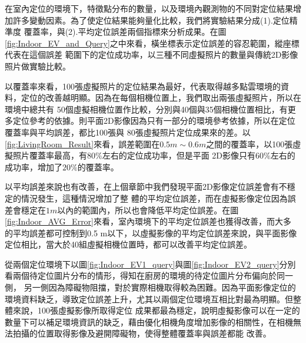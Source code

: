 		在室內定位的環境下，特徵點分布的數量，以及環境內觀測物的不同對定位結果增加許多變動因素。為了使定位結果能夠量化比較，我們將實驗結果分成(1).定位精準度
	覆蓋率，與(2).平均定位誤差兩個指標來分析成果。在圖\ref{fig:Indoor_EV_and_Query}之中來看，橫坐標表示定位誤差的容忍範圍，縱座標代表在這個誤差
	範圍下的定位成功率，以三種不同虛擬照片的數量與傳統2D影像照片做實驗比較。
	
		以覆蓋率來看，100張虛擬照片的定位結果為最好，代表取得越多點雲環境的資料，定位的改善越明顯。因為在每個相機位置上，我們取出兩張虛擬照片，所以在環境中總共有
	50個虛擬相機位置作比較，分別與40個與35個相機位置相比，有更多定位參考的依據。則平面2D影像因為只有一部分的環境參考依據，所以在定位覆蓋率與平均誤差，都比100張與
	80張虛擬照片定位成果來的差。以\ref{fig:LivingRoom_Result}來看，誤差範圍在$0.5m \sim 0.6m$之間的覆蓋率，以100張虛擬照片覆蓋率最高，有$80\%$左右的定位成功率，但是平面
	2D影像只有$60\%$左右的成功率，增加了$20\%$的覆蓋率。
	
		以平均誤差來說也有改善，在上個章節中我們發現平面2D影像定位誤差會有不穩定的情況發生，這種情況增加了整
	體的平均定位誤差，而在虛擬影像定位因為誤差會穩定在$1m$以內的範圍內，所以也會降低平均定位誤差。在圖\ref{fig:Indoor_AVG_Error}來看，室內環境下的平均定位誤差也獲得改善，而大多
	的平均誤差都可控制到0.5 m以下，以虛擬影像的平均定位誤差來說，與平面影像定位相比，當大於40組虛擬相機位置時，都可以改善平均定位誤差。
	
		從兩個定位環境下以圖\ref{fig:Indoor_EV1_query}與圖\ref{fig:Indoor_EV2_query}分別看兩個待定位圖片分布的情形，得知在廚房的環境的待定位圖片分布偏向於同一側，
	另一側因為障礙物阻擋，對於實際相機取得較為困難。因為平面影像定位的環境資料缺乏，導致定位誤差上升，尤其以兩個定位環境互相比對最為明顯。但整體來說，100張虛擬影像所取得定位
	成果都最為穩定，說明虛擬影像可以在一定的數量下可以補足環境資訊的缺乏，藉由優化相機角度增加影像的相關性，在相機無法拍攝的位置取得影像及避開障礙物，使得整體覆蓋率與誤差都能
	改善。

